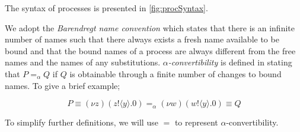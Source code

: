 The syntax of processes is presented in \autoref{fig:procSyntax}. 

We adopt the \textit{Barendregt name convention} which states that there is an infinite number of names such that there always exists a fresh name available to be bound and that the bound names of a process are always different from the free names and the names of any substitutions. ${\alpha}$\textit{-convertibility} is defined in \citep{sangiorgi2003pi} stating that $P =_\alpha Q$ if $Q$ is obtainable through a finite number of changes to bound names. To give a brief example; 

\begin{equation*}
    P \equiv (\nu z)(z!\langle y \rangle.0) =_\alpha (\nu w)(w!\langle y \rangle.0) \equiv Q
\end{equation*}

To simplify further definitions, we will use $\boldsymbol=$ to represent $\alpha$-convertibility.

